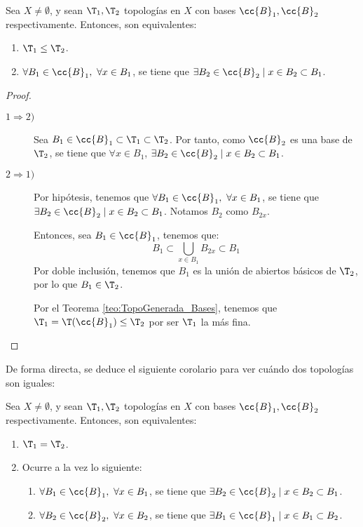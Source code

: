 \begin{prop}
    Sea $X\neq \emptyset$, y sean $\T_1, \T_2$ topologías en $X$ con bases $\cc{B}_1, \cc{B}_2$ respectivamente. Entonces, son equivalentes:
    \begin{enumerate}
        \item $\T_1\leq \T_2$.
        \item $\forall B_1\in \cc{B}_1,~\forall x\in B_1$, se tiene que $\exists B_2\in \cc{B}_2\mid x\in B_2\subset B_1$.
    \end{enumerate}
\end{prop}
\begin{proof}\
    \begin{description}
        \item[$1\Longrightarrow 2)$] Sea $B_1\in \cc{B}_1\subset \T_1\subset \T_2$. Por tanto, como $\cc{B}_2$ es una base de $\T_2$, se tiene que $\forall x\in B_1$, $\exists B_2\in \cc{B}_2\mid x\in B_2\subset B_1$.

        \item[$2\Longrightarrow 1)$] Por hipótesis, tenemos que
        $\forall B_1\in \cc{B}_1,~\forall x\in B_1$, se tiene que $\exists B_2\in \cc{B}_2\mid x\in B_2\subset B_1$. Notamos $B_2$ como $B_{2x}$.
        
        Entonces, sea $B_1\in \cc{B}_1$, tenemos que:
        $$B_1\subset \bigcup_{x\in B_1}B_{2x}\subset B_1$$
        Por doble inclusión, tenemos que $B_1$ es la unión de abiertos básicos de $\T_2$, por lo que $B_1\in \T_2$.
        
        Por el Teorema \ref{teo:TopoGenerada_Bases}, tenemos que $\T_1=\T(\cc{B}_1)\leq \T_2$ por ser $\T_1$ la más fina.
    \end{description}
\end{proof}

De forma directa, se deduce el siguiente corolario para ver cuándo dos topologías son iguales:
\begin{coro}\label{coro:TopIg_Bases}
    Sea $X\neq \emptyset$, y sean $\T_1, \T_2$ topologías en $X$ con bases $\cc{B}_1, \cc{B}_2$ respectivamente. Entonces, son equivalentes:
    \begin{enumerate}
        \item $\T_1 = \T_2$.
        \item Ocurre a la vez lo siguiente:
        \begin{enumerate}
            \item $\forall B_1\in \cc{B}_1,~\forall x\in B_1$, se tiene que $\exists B_2\in \cc{B}_2\mid x\in B_2\subset B_1$.
            \item $\forall B_2\in \cc{B}_2,~\forall x\in B_2$, se tiene que $\exists B_1\in \cc{B}_1\mid x\in B_1\subset B_2$.
        \end{enumerate}
    \end{enumerate}
\end{coro}


